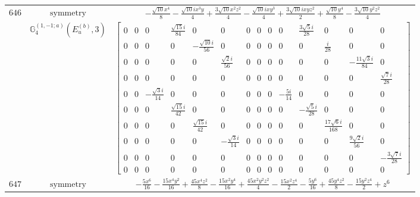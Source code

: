 \documentclass[fleqn,8pt,landscape]{jsarticle}
\begin{document}
\begin{longtable}{ccc}
$ 646 $ & $ \text{symmetry} $ & $ - \frac{\sqrt{10} x^{4}}{8} - \frac{\sqrt{10} i x^{3} y}{4} + \frac{3 \sqrt{10} x^{2} z^{2}}{4} - \frac{\sqrt{10} i x y^{3}}{4} + \frac{3 \sqrt{10} i x y z^{2}}{2} + \frac{\sqrt{10} y^{4}}{8} - \frac{3 \sqrt{10} y^{2} z^{2}}{4} $ \\
$  $ & $ \mathbb{G}_{4}^{(1,-1;a)}(E_{u}^{(b)},3) $ & $ \begin{bmatrix} 0 & 0 & 0 & \frac{\sqrt{15} i}{84} & 0 & 0 & 0 & 0 & 0 & 0 & \frac{3 \sqrt{5} i}{28} & 0 & 0 & 0 \\ 0 & 0 & 0 & 0 & - \frac{\sqrt{10} i}{56} & 0 & 0 & 0 & 0 & 0 & 0 & \frac{i}{28} & 0 & 0 \\ 0 & 0 & 0 & 0 & 0 & \frac{\sqrt{2} i}{56} & 0 & 0 & 0 & 0 & 0 & 0 & - \frac{11 \sqrt{3} i}{84} & 0 \\ 0 & 0 & 0 & 0 & 0 & 0 & 0 & 0 & 0 & 0 & 0 & 0 & 0 & \frac{\sqrt{7} i}{28} \\ 0 & 0 & - \frac{\sqrt{3} i}{14} & 0 & 0 & 0 & 0 & 0 & 0 & - \frac{5 i}{14} & 0 & 0 & 0 & 0 \\ 0 & 0 & 0 & \frac{\sqrt{15} i}{42} & 0 & 0 & 0 & 0 & 0 & 0 & - \frac{\sqrt{5} i}{28} & 0 & 0 & 0 \\ 0 & 0 & 0 & 0 & \frac{\sqrt{15} i}{42} & 0 & 0 & 0 & 0 & 0 & 0 & \frac{17 \sqrt{6} i}{168} & 0 & 0 \\ 0 & 0 & 0 & 0 & 0 & - \frac{\sqrt{3} i}{14} & 0 & 0 & 0 & 0 & 0 & 0 & \frac{9 \sqrt{2} i}{56} & 0 \\ 0 & 0 & 0 & 0 & 0 & 0 & 0 & 0 & 0 & 0 & 0 & 0 & 0 & - \frac{3 \sqrt{7} i}{28} \\ 0 & 0 & 0 & 0 & 0 & 0 & 0 & 0 & 0 & 0 & 0 & 0 & 0 & 0 \end{bmatrix} $ \\ \hline
$ 647 $ & $ \text{symmetry} $ & $ - \frac{5 x^{6}}{16} - \frac{15 x^{4} y^{2}}{16} + \frac{45 x^{4} z^{2}}{8} - \frac{15 x^{2} y^{4}}{16} + \frac{45 x^{2} y^{2} z^{2}}{4} - \frac{15 x^{2} z^{4}}{2} - \frac{5 y^{6}}{16} + \frac{45 y^{4} z^{2}}{8} - \frac{15 y^{2} z^{4}}{2} + z^{6} $ \\

\end{longtable}
\end{document}
